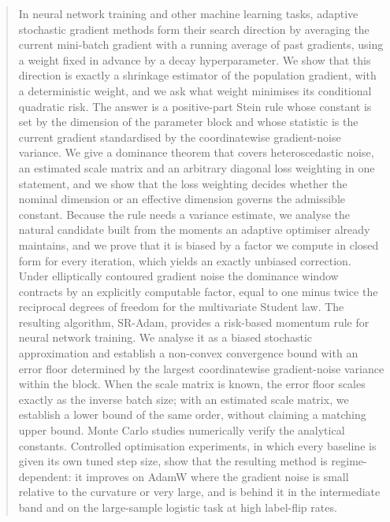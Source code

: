 \documentclass[a4paper,fleqn]{cas-dc}
\theoremstyle{plain}
\theoremstyle{definition}
\theoremstyle{remark}
\begin{document}
\begin{abstract}
In neural network training and other machine learning tasks, adaptive stochastic gradient methods form their search direction by averaging the current mini-batch gradient with a running average of past gradients, using a weight fixed in advance by a decay hyperparameter. We show that this direction is exactly a shrinkage estimator of the population gradient, with a deterministic weight, and we ask what weight minimises its conditional quadratic risk. The answer is a positive-part Stein rule whose constant is set by the dimension of the parameter block and whose statistic is the current gradient standardised by the coordinatewise gradient-noise variance. We give a dominance theorem that covers heteroscedastic noise, an estimated scale matrix and an arbitrary diagonal loss weighting in one statement, and we show that the loss weighting decides whether the nominal dimension or an effective dimension governs the admissible constant. Because the rule needs a variance estimate, we analyse the natural candidate built from the moments an adaptive optimiser already maintains, and we prove that it is biased by a factor we compute in closed form for every iteration, which yields an exactly unbiased correction. Under elliptically contoured gradient noise the dominance window contracts by an explicitly computable factor, equal to one minus twice the reciprocal degrees of freedom for the multivariate Student law. The resulting algorithm, SR-Adam, provides a risk-based momentum rule for neural network training. We analyse it as a biased stochastic approximation and establish a non-convex convergence bound with an error floor determined by the largest coordinatewise gradient-noise variance within the block. When the scale matrix is known, the error floor scales exactly as the inverse batch size; with an estimated scale matrix, we establish a lower bound of the same order, without claiming a matching upper bound. Monte Carlo studies numerically verify the analytical constants. Controlled optimisation experiments, in which every baseline is given its own tuned step size, show that the resulting method is regime-dependent: it improves on AdamW where the gradient noise is small relative to the curvature or very large, and is behind it in the intermediate band and on the large-sample logistic task at high label-flip rates.
\end{abstract}

\end{document}
